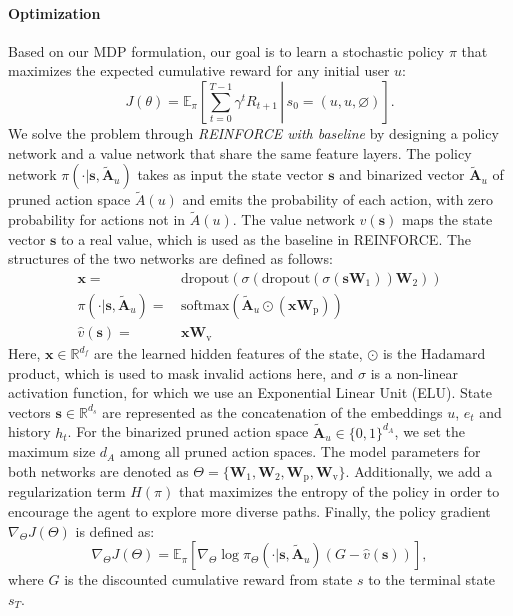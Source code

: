 \documentclass[sigconf]{acmart}
\begin{document}
\paragraph{Optimization}
Based on our MDP formulation, our goal is to learn a stochastic policy $\pi$ that maximizes the expected cumulative reward for any initial user $u$:
\begin{equation}
J(\theta)=\mathds{E}_{\pi}\left[ \left. \sum_{t=0}^{T-1}\gamma^{t}R_{t+1}\,\right\vert\, s_0=(u,u,\varnothing)\right].
\end{equation}
We solve the problem through \emph{REINFORCE with baseline} \cite{sutton2018reinforcement} by designing a policy network and a value network that share the same feature layers.
The policy network $\pi(\cdot|\mathbf{s},\mathbf{\tilde{A}}_u)$ takes as input the state vector $\mathbf{s}$ and binarized vector $\mathbf{\tilde{A}}_u$ of pruned action space $\tilde{A}(u)$ and emits the probability of each action, with zero probability for actions not in $\tilde{A}(u)$.
The value network $\hat{v}(\mathbf{s})$ maps the state vector $\mathbf{s}$ to a real value, which is used as the baseline in REINFORCE.
The structures of the two networks are defined as follows:
\begin{align}
 \mathbf{x}=&\,\text{dropout}(\sigma(\text{dropout}(\sigma(\mathbf{s} \mathbf{W}_1))\mathbf{W}_2)) \\
 \pi(\cdot|\mathbf{s},\mathbf{\tilde{A}}_u)=&\, \text{softmax}(\mathbf{\tilde{A}}_u\odot (\mathbf{x}\mathbf{W}_\text{p})) \\
 \hat{v}(\mathbf{s})=&\,\mathbf{x}\mathbf{W}_\text{v}
\end{align}
Here, $\mathbf{x}\in\mathds{R}^{d_f}$ are the learned hidden features of the state, $\odot$ is the Hadamard product, which is used to mask invalid actions here, and $\sigma$ is a non-linear activation function, for which we use an Exponential Linear Unit (ELU).
State vectors $\mathbf{s}\in\mathds{R}^{d_s}$ are represented as the concatenation of the embeddings $u$, $e_t$ and history ${h_t}$.
For the binarized pruned action space $\mathbf{\tilde{A}}_u\in\{0,1\}^{d_A}$, we set the maximum size $d_A$ among all pruned action spaces. 
The model parameters for both networks are denoted as $\Theta=\{\mathbf{W}_1, \mathbf{W}_2, \mathbf{W}_\text{p}, \mathbf{W}_\text{v}\}$.
Additionally, we add a regularization term $H(\pi)$ that maximizes the entropy of the policy in order to encourage the agent to explore more diverse paths.
Finally, the policy gradient $\nabla_{\Theta}J(\Theta)$ is defined as:  
\begin{equation}
\nabla_{\Theta} J(\Theta)=\mathds{E}_{\pi}\left[\nabla_{\Theta}\log \pi_{\Theta}(\cdot|\mathbf{s},\mathbf{\tilde{A}}_u) \left(G-\hat{v}(\mathbf{s})\right) \right],
\end{equation}
where $G$ is the discounted cumulative reward from state $s$ to the terminal state $s_T$.
\end{document}
